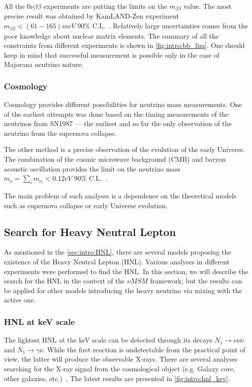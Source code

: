 \documentclass[../main.tex]{subfiles}
\begin{document}
All the $0\nu\beta\beta$ experiments are putting the limits on the $m_{\beta\beta}$ value. The most precise result was obtained by KamLAND-Zen experiment $m_{\beta\beta} < (61-165) meV$ 90\% C.L.~\cite{Gando2016}. Relatively large uncertainties comes from the poor knowledge about nuclear matrix elements. The summary of all the constraints from different experiments is shown in \autoref{fig:intro:bb_lim}. One should keep in mind that successful measurement is possible only in the case of Majorana neutrino nature.

\subsubsection{Cosmology}
Cosmology provides different possibilities for neutrino mass measurements. One of the earliest attempts was done based on the timing measurements of the neutrinos from SN1987 --- the earliest and so far the only observation of the neutrino from the supernova collapse.

The other method is a precise observation of the evolution of the early Universe. The combination of the cosmic microwave background (CMB) and baryon acoustic oscillation provides the limit on the neutrino mass $m_\nu=\sum_i m_{\nu_i}<0.12eV$ 90\% C.L.~\cite{Palanque-Delabrouille2015}.

The main problem of such analyses is a dependence on the theoretical models such as supernova collapse or early Universe evolution.

\subsection{Search for Heavy Neutral Lepton}
\label{sec:intro:HNL_exp}
As mentioned in the \autoref{sec:intro:HNL}, there are several models proposing the existence of the Heavy Neutral Lepton (HNL). Various analyses in different experiments were performed to find the HNL. In this section, we will describe the search for the HNL in the context of the $\nu MSM$ framework, but the results can be applied for other models introducing the heavy neutrino via mixing with the active one.

\subsubsection{HNL at keV scale}
The lightest HNL at the keV scale can be detected through its decays $N_1\to \nu\nu\overline{\nu}$ and $N_1\to\gamma\nu$. While the first reaction is undetectable from the practical point of view, the latter will produce the observable X-rays. There are several analyses searching for the X-ray signal from the cosmological object (e.g. Galaxy core, other galaxies, etc.)~\cite{Ng2019, Perez2017}. The latest results are presented in \autoref{fig:intro:hnl_kev}.
\end{document}
